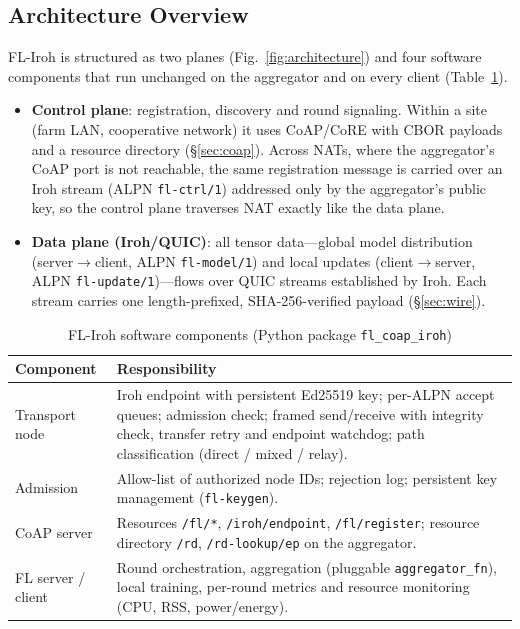 \documentclass[a4paper,fleqn]{cas-dc}
\begin{document}
\subsection{Architecture Overview}

FL-Iroh is structured as two planes (Fig.~\ref{fig:architecture}) and four software components that run unchanged on the aggregator and on every client (Table~\ref{tab:components}).

\begin{itemize}
    \item \textbf{Control plane}: registration, discovery and round signaling. Within a site (farm LAN, cooperative network) it uses CoAP/CoRE with CBOR payloads and a resource directory (\S\ref{sec:coap}). Across NATs, where the aggregator's CoAP port is not reachable, the same registration message is carried over an Iroh stream (ALPN \texttt{fl-ctrl/1}) addressed only by the aggregator's public key, so the control plane traverses NAT exactly like the data plane.
    \item \textbf{Data plane (Iroh/QUIC)}: all tensor data---global model distribution (server$\to$client, ALPN \texttt{fl-model/1}) and local updates (client$\to$server, ALPN \texttt{fl-update/1})---flows over QUIC streams established by Iroh. Each stream carries one length-prefixed, SHA-256-verified payload (\S\ref{sec:wire}).
\end{itemize}

\begin{table}[t]
\centering
\caption{FL-Iroh software components (Python package \texttt{fl\_coap\_iroh})}
\label{tab:components}
\scriptsize
\setlength{\tabcolsep}{3pt}
\begin{tabular}{@{}p{2.0cm} p{5.9cm}@{}}
\toprule
\textbf{Component} & \textbf{Responsibility} \\
\midrule
Transport node & Iroh endpoint with persistent Ed25519 key; per-ALPN accept queues; admission check; framed send/receive with integrity check, transfer retry and endpoint watchdog; path classification (direct / mixed / relay). \\
Admission & Allow-list of authorized node IDs; rejection log; persistent key management (\texttt{fl-keygen}). \\
CoAP server & Resources \texttt{/fl/*}, \texttt{/iroh/endpoint}, \texttt{/fl/register}; resource directory \texttt{/rd}, \texttt{/rd-lookup/ep} on the aggregator. \\
FL server / client & Round orchestration, aggregation (pluggable \texttt{aggregator\_fn}), local training, per-round metrics and resource monitoring (CPU, RSS, power/energy). \\
\bottomrule
\end{tabular}
\end{table}
\end{document}
